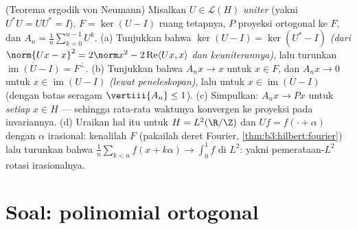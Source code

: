 \begin{exercise}[$\star\star\star$]\label{exo:b3:hilbert:12}
(Teorema ergodik von Neumann) Misalkan $U \in \mathcal L(H)$
\emph{uniter} (yakni $U^*U = UU^* = I$), $F = \ker(U - I)$
ruang tetapnya, $P$ proyeksi ortogonal ke $F$, dan
$A_n = \frac1n\sum_{k=0}^{n-1}U^k$.
(a) Tunjukkan bahwa $\ker(U - I) = \ker(U^* - I)$ \emph{(dari
$\norm{Ux - x}^2 = 2\norm x^2 - 2\operatorname{Re}\langle
Ux, x\rangle$ dan keuniterannya)}, lalu turunkan
$\overline{\operatorname{im}(U - I)} = F^\perp$.
(b) Tunjukkan bahwa $A_nx \to x$ untuk $x \in F$, dan $A_nx \to 0$
untuk $x \in \operatorname{im}(U - I)$ \emph{(lewat peneleskopan)},
lalu untuk $x \in \overline{\operatorname{im}(U - I)}$
(dengan batas seragam $\vertiii{A_n} \leq 1$).
(c) Simpulkan: $A_nx \to Px$ untuk \emph{setiap} $x \in H$ ---
sehingga rata-rata waktunya konvergen ke proyeksi pada invariannya.
(d) Uraikan hal itu untuk $H = L^2(\R/\Z)$ dan $Uf = f(\cdot +
\alpha)$ dengan $\alpha$ irasional: kenalilah $F$ (pakailah
deret Fourier, \cref{thm:b3:hilbert:fourier}) lalu turunkan
bahwa $\frac1n\sum_{k<n}f(x + k\alpha) \to \int_0^1f$ di
$L^2$: yakni pemerataan-$L^2$ rotasi irasionalnya.
\end{exercise}

\section{Soal: polinomial ortogonal}

